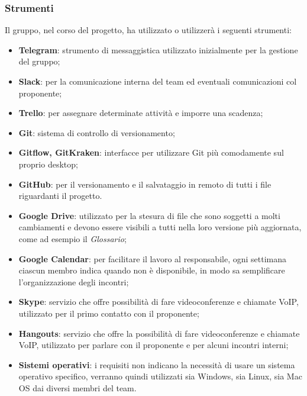 		\subsubsection{Strumenti}
		Il gruppo, nel corso del progetto, ha utilizzato o utilizzerà i seguenti strumenti:
		\begin{itemize}
			\item \textbf{Telegram}: strumento di messaggistica utilizzato inizialmente per la gestione del gruppo;
			\item \textbf{Slack}: per la comunicazione interna del team ed eventuali comunicazioni col proponente;
			\item \textbf{Trello}: per assegnare determinate attività e imporre una scadenza;
			\item \textbf{Git}: sistema di controllo di versionamento;
			\item \textbf{Gitflow, GitKraken}: interfacce per utilizzare Git più comodamente sul proprio desktop;
			\item \textbf{GitHub}: per il versionamento e il salvataggio in remoto di tutti i file riguardanti il progetto.
			\item \textbf{Google Drive}: utilizzato per la stesura di file che sono soggetti a molti cambiamenti e devono essere visibili a tutti nella loro versione più aggiornata, come ad esempio il \textit{Glossario};
			\item \textbf{Google Calendar}: per facilitare il lavoro al responsabile, ogni settimana ciascun membro indica quando non è disponibile, in modo sa semplificare l'organizzazione degli incontri;
			\item \textbf{Skype}: servizio che offre possibilità di fare videoconferenze e chiamate VoIP, utilizzato per il primo contatto con il proponente;
			\item \textbf{Hangouts}: servizio che offre la possibilità di fare videoconferenze e chiamate VoIP, utilizzato per parlare con il proponente e per alcuni incontri interni;
			\item \textbf{Sistemi operativi}: i requisiti non indicano la necessità di usare un sistema operativo specifico, verranno quindi utilizzati sia Windows, sia Linux, sia Mac OS dai diversi membri del team. %
		\end{itemize}
	